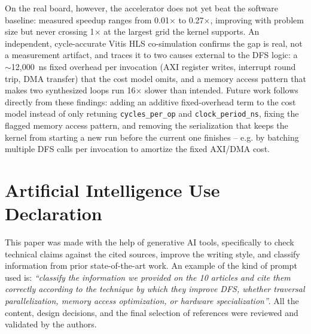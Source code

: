 \documentclass[conference]{IEEEtran}
\begin{document}
On the real board, however, the accelerator does not yet beat the software
baseline: measured speedup ranges from 0.01$\times$ to 0.27$\times$,
improving with problem size but never crossing 1$\times$ at the largest
grid the kernel supports. An independent, cycle-accurate Vitis HLS
co-simulation confirms the gap is real, not a measurement artifact, and
traces it to two causes external to the DFS logic: a $\sim$12{,}000~ns
fixed overhead per invocation (AXI register writes, interrupt round trip,
DMA transfer) that the cost model omits, and a memory access pattern that
makes two synthesized loops run 16$\times$ slower than intended. Future
work follows directly from these findings: adding an additive
fixed-overhead term to the cost model instead of only retuning
\texttt{cycles\_per\_op} and \texttt{clock\_period\_ns}, fixing the
flagged memory access pattern, and removing the serialization that keeps
the kernel from starting a new run before the current one finishes --
e.g. by batching multiple DFS calls per invocation to amortize the fixed
AXI/DMA cost.

\section*{Artificial Intelligence Use Declaration}
This paper was made with the help of generative AI tools, specifically to check technical claims against the cited sources, improve the writing style, and classify information from prior state-of-the-art work. An example of the kind of prompt used is: \textit{``classify the information we provided on the 10 articles and cite them correctly according to the technique by which they improve DFS, whether traversal parallelization, memory access optimization, or hardware specialization''}. All the content, design decisions, and the final selection of references were reviewed and validated by the authors.



\end{document}
